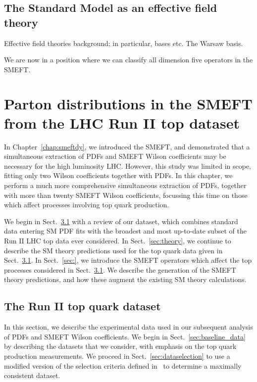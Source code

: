 \documentclass[withindex,glossary]{cam-thesis}
\begin{document}
\section{The Standard Model as an effective field theory}

Effective field theories background; in particular, bases etc. The Warsaw basis.

We are now in a position where we can classify all dimension five operators in the SMEFT. 

\section{}




\newpage
\chapter{Parton distributions in the SMEFT from the LHC Run II top dataset}
\label{chap:top}

In Chapter~\ref{chap:smeftdy}, we introduced the SMEFT, and demonstrated that a simultaneous extraction of PDFs and SMEFT Wilson coefficients may be necessary for the high luminosity LHC. However, this study was limited in scope, fitting only two Wilson coefficients together with PDFs. In this chapter, we perform a much more comprehensive simultaneous extraction of PDFs, together with more than twenty SMEFT Wilson coefficients, focussing this time on those which affect processes involving top quark production.

We begin in Sect.~\ref{sec:exp} with a review of our dataset, which combines standard data entering SM PDF fits with the broadest and most up-to-date subset of the Run II LHC top data ever considered. In Sect.~\ref{sec:theory}, we continue to describe the SM theory predictions used for the top quark data given in Sect.~\ref{sec:exp}. In Sect.~\ref{sec:}, we introduce the SMEFT operators which affect the top processes considered in Sect.~\ref{sec:exp}. We describe the generation of the SMEFT theory predictions, and how these augment the existing SM theory calculations.


\section{The Run II top quark dataset}
\label{sec:exp}

In this section, we describe the experimental data used in our subsequent analysis of PDFs and SMEFT Wilson coefficients. We begin in Sect.~\ref{sec:baseline_data} by 
describing the datasets that we consider, with
emphasis on the top quark production measurements. We proceed in Sect.~\ref{sec:dataselection} 
to use a modified version of the selection criteria
defined in~\cite{NNPDF:2021njg}
to determine a maximally consistent dataset.
\end{document}
